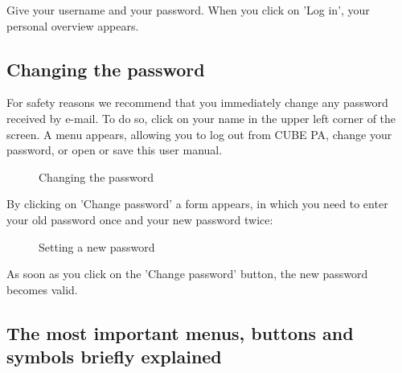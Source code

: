 Give your username and your password. When you click on 'Log in', your personal overview appears.

\subsection{Changing the password}
\label{bkm:Ref434828103}

For safety reasons we recommend that you immediately change any password received by e-mail. To do so, click on your name in the upper left corner of the screen. A menu appears, allowing you to log out from CUBE PA, change your password, or open or save this user manual.

\begin{figure}[H]
\caption{Changing the password}
\end{figure}

By clicking on 'Change password' a form appears, in which you need to enter your old password once and your new password twice:

\begin{figure}[H]
\caption{Setting a new password}
\end{figure}

As soon as you click on the 'Change password' button, the new password becomes valid.

\subsection{The most important menus, buttons and symbols briefly explained}


